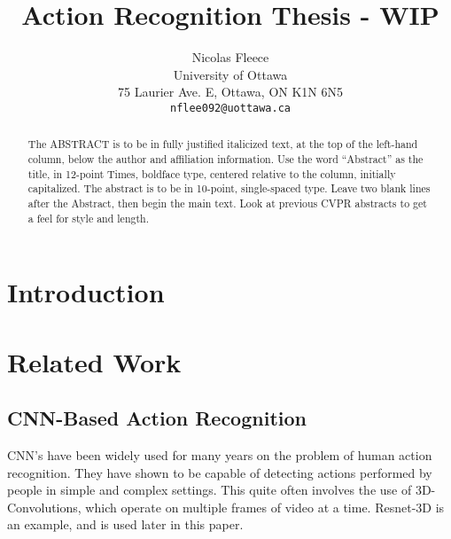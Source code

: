 \documentclass[10pt,twocolumn,letterpaper]{article}
\begin{document}
\title{Action Recognition Thesis - WIP}

\author{Nicolas Fleece\\
University of Ottawa\\
75 Laurier Ave. E, Ottawa, ON K1N 6N5\\
{\tt\small nflee092@uottawa.ca}
}
\maketitle

\begin{abstract}
   The ABSTRACT is to be in fully justified italicized text, at the top of the left-hand column, below the author and affiliation information.
   Use the word ``Abstract'' as the title, in 12-point Times, boldface type, centered relative to the column, initially capitalized.
   The abstract is to be in 10-point, single-spaced type.
   Leave two blank lines after the Abstract, then begin the main text.
   Look at previous CVPR abstracts to get a feel for style and length.
\end{abstract}

\section{Introduction}
\label{sec:intro}

\section{Related Work}

\subsection{CNN-Based Action Recognition}

CNN's have been widely used for many years on the problem of human action recognition. They have shown to be capable of detecting actions performed by people in simple and complex settings. This quite often involves the use of 3D-Convolutions, which operate on multiple frames of video at a time. Resnet-3D is an example, and is used later in this paper.
\end{document}
